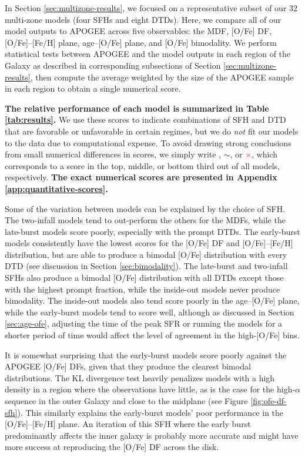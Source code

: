 \documentclass[twocolumn,twocolappendix,linenumbers]{aastex631}
\newcommand{\yes}{\textcolor{green}{\checkmark}\xspace}
\newcommand{\meh}{\textcolor{black}{$\sim$}\xspace}
\newcommand{\no}{\textcolor{red}{$\times$}\xspace}
\begin{document}
\vspace{-24pt}

In Section \ref{sec:multizone-results}, we focused on a representative subset of our 32 multi-zone models (four SFHs and eight DTDs). Here, we compare all of our model outputs to APOGEE across five observables: the MDF, [O/Fe] DF, [O/Fe]--[Fe/H] plane, age--[O/Fe] plane, and [O/Fe] bimodality. We perform statistical tests between APOGEE and the model outputs in each region of the Galaxy as described in corresponding subsections of Section \ref{sec:multizone-results}, then compute the average weighted by the size of the APOGEE sample in each region to obtain a single numerical score.

{\bf The relative performance of each model is summarized in Table \ref{tab:results}.} We use these scores to indicate combinations of SFH and DTD that are favorable or unfavorable in certain regimes, but we do {\it not} fit our models to the data due to computational expense. To avoid drawing strong conclusions from small numerical differences in scores, we simply write \yes, \meh, or \no, which corresponds to a score in the top, middle, or bottom third out of all models, respectively. {\bf The exact numerical scores are presented in Appendix \ref{app:quantitative-scores}.}

Some of the variation between models can be explained by the choice of SFH. The two-infall models tend to out-perform the others for the MDFs, while the late-burst models score poorly, especially with the prompt DTDs. The early-burst models consistently have the lowest scores for the [O/Fe] DF and [O/Fe]--[Fe/H] distribution, but are able to produce a bimodal [O/Fe] distribution with every DTD (see discussion in Section \ref{sec:bimodality}). The late-burst and two-infall SFHs also produce a bimodal [O/Fe] distribution with all DTDs except those with the highest prompt fraction, while the inside-out models never produce bimodality. The inside-out models also tend score poorly in the age--[O/Fe] plane, while the early-burst models tend to score well, although as discussed in Section \ref{sec:age-ofe}, adjusting the time of the peak SFR or running the models for a shorter period of time would affect the level of agreement in the high-[O/Fe] bins.

It is somewhat surprising that the early-burst models score poorly against the APOGEE [O/Fe] DFs, given that they produce the clearest bimodal distributions. The KL divergence test heavily penalizes models with a high density in a region where the observations have little, as is the case for the high-$\alpha$ sequence in the outer Galaxy and close to the midplane (see Figure \ref{fig:ofe-df-sfh}). This similarly explains the early-burst models' poor performance in the [O/Fe]--[Fe/H] plane. An iteration of this SFH where the early burst predominantly affects the inner galaxy is probably more accurate and might have more success at reproducing the [O/Fe] DF across the disk.
\end{document}

